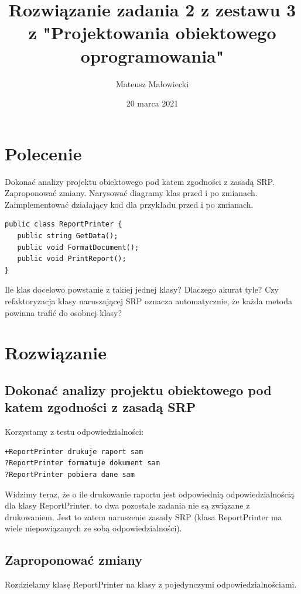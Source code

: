 \documentclass[10pt, a4paper]{article}
\title{Rozwiązanie zadania 2 z zestawu 3 z "Projektowania obiektowego oprogramowania"}
\author{Mateusz Małowiecki}
\date{20 marca 2021}
\begin{document}
\maketitle
\section*{Polecenie}
Dokonać analizy projektu obiektowego pod
katem zgodności z zasadą SRP. Zaproponować zmiany. Narysować diagramy klas przed i
po zmianach. Zaimplementować działający kod dla przykładu przed i po zmianach.
\begin{verbatim}
public class ReportPrinter {
   public string GetData();
   public void FormatDocument();
   public void PrintReport();
}
\end{verbatim}
Ile klas docelowo powstanie z takiej jednej klasy? Dlaczego akurat tyle? Czy refaktoryzacja klasy naruszającej SRP oznacza automatycznie, że każda metoda powinna trafić do
osobnej klasy?

\section*{Rozwiązanie}
\subsection*{Dokonać analizy projektu obiektowego pod
katem zgodności z zasadą SRP}
Korzystamy z testu odpowiedzialności:
\begin{verbatim}
+ReportPrinter drukuje raport sam
?ReportPrinter formatuje dokument sam
?ReportPrinter pobiera dane sam
\end{verbatim}
Widzimy teraz, że o ile drukowanie raportu jest odpowiednią odpowiedzialnością dla klasy ReportPrinter, to dwa pozostałe zadania nie są związane z drukowaniem. Jest to zatem naruszenie zasady SRP (klasa ReportPrinter ma wiele niepowiązanych ze sobą odpowiedzialności).
\subsection*{Zaproponować zmiany}
Rozdzielamy klasę ReportPrinter na klasy z pojedynczymi odpowiedzialnościami.
\end{document}

